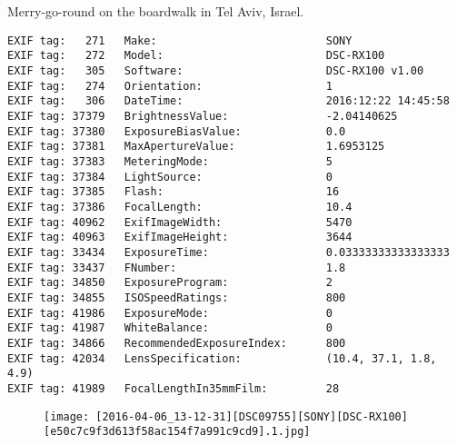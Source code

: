 \section{\protect{}}
\noindent Merry-go-round on the boardwalk in Tel Aviv, Israel.
\noindent
\begin{lstlisting}
EXIF tag:   271   Make:                          SONY
EXIF tag:   272   Model:                         DSC-RX100
EXIF tag:   305   Software:                      DSC-RX100 v1.00
EXIF tag:   274   Orientation:                   1
EXIF tag:   306   DateTime:                      2016:12:22 14:45:58
EXIF tag: 37379   BrightnessValue:               -2.04140625
EXIF tag: 37380   ExposureBiasValue:             0.0
EXIF tag: 37381   MaxApertureValue:              1.6953125
EXIF tag: 37383   MeteringMode:                  5
EXIF tag: 37384   LightSource:                   0
EXIF tag: 37385   Flash:                         16
EXIF tag: 37386   FocalLength:                   10.4
EXIF tag: 40962   ExifImageWidth:                5470
EXIF tag: 40963   ExifImageHeight:               3644
EXIF tag: 33434   ExposureTime:                  0.03333333333333333
EXIF tag: 33437   FNumber:                       1.8
EXIF tag: 34850   ExposureProgram:               2
EXIF tag: 34855   ISOSpeedRatings:               800
EXIF tag: 41986   ExposureMode:                  0
EXIF tag: 41987   WhiteBalance:                  0
EXIF tag: 34866   RecommendedExposureIndex:      800
EXIF tag: 42034   LensSpecification:             (10.4, 37.1, 1.8, 4.9)
EXIF tag: 41989   FocalLengthIn35mmFilm:         28

\end{lstlisting}
\clearpage
\begin{figure}
\raggedleft
\texttt{[image: [2016-04-06\_13-12-31][DSC09755][SONY][DSC-RX100][e50c7c9f3d613f58ac154f7a991c9cd9].1.jpg]}
\end{figure}


\clearpage
